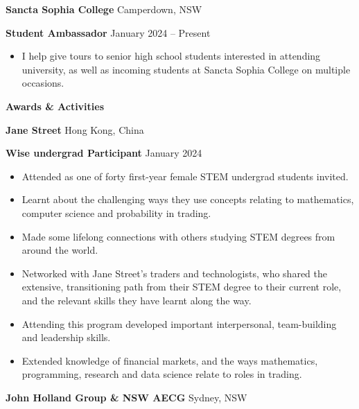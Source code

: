 \documentclass[11pt]{article}
\begin{document}
\vspace{12pt}

\textbf{Sancta Sophia College} \hfill Camperdown, NSW

\textbf{Student Ambassador} \hfill January 2024 – Present
\begin{itemize}[noitemsep, topsep=0pt, partopsep=0pt, parsep=0pt]
    \item I help give tours to senior high school students interested in attending university, as well as incoming students at Sancta Sophia College on multiple occasions.
\end{itemize}

\vspace{12pt}


\begin{center}
    \textbf{Awards \& Activities}\\
    \hrulefill
\end{center}

\textbf{Jane Street} \hfill Hong Kong, China

\textbf{Wise undergrad Participant} \hfill January 2024
\begin{itemize}[noitemsep, topsep=0pt, partopsep=0pt, parsep=0pt]
    \item Attended as one of forty first-year female STEM undergrad students invited.
    \item Learnt about the challenging ways they use concepts relating to mathematics, computer science and probability in trading.
    \item Made some lifelong connections with others studying STEM degrees from around the world.
    \item Networked with Jane Street’s traders and technologists, who shared the extensive, transitioning path from their STEM degree to their current role, and the relevant skills they have learnt along the way.
    \item Attending this program developed important interpersonal, team-building and leadership skills.
    \item Extended knowledge of financial markets, and the ways mathematics, programming, research and data science relate to roles in trading.
\end{itemize}

\vspace{12pt}

\textbf{John Holland Group \& NSW AECG} \hfill Sydney, NSW
\end{document}
